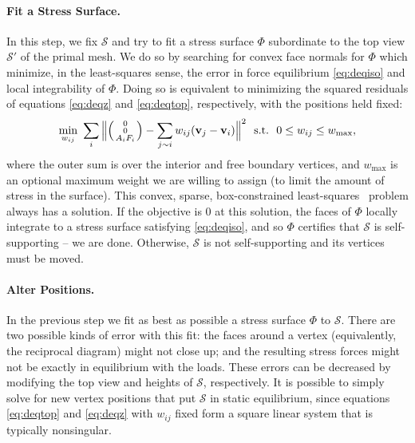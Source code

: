 \documentclass[annual]{acmsiggraph}
\makeatletter
\def\Forcevector{\Big(\mbox{\scriptsize
	\def\arraystretch{0.8}\begin{tabular}{@{\,}c@{\,}}
	0 \\ 0 \\ $A_i F_i$
	\end{tabular}}\Big)}
\def\SS{{\mathcal S}}
\makeatother
\begin{document}
\paragraph{Fit a Stress Surface.} In this step, we fix $\SS$ and try to
fit a stress surface $\Phi$ subordinate to the top view $\SS'$ of the
primal mesh. We do so by searching for convex face normals for $\Phi$
which minimize, in the least-squares sense, the error in force equilibrium
\eqref{eq:deqiso} and local integrability of $\Phi$. Doing so is
equivalent to minimizing the squared residuals of equations
\eqref{eq:deqz} and \eqref{eq:deqtop}, respectively, with the positions
held fixed:
	\begin{align}
	\min_{w_{ij}}\
	\sum_i
	\Big\| \Forcevector -
		\sum_{j\sim i} w_{ij} (\vw_j-\vw_i) \Big\|^2
	\ \
	\textrm{s.t.}\ \
		0 \leq w_{ij} \leq w_{\max}, \label{eq:wbounds}
\end{align}
 where the outer sum is over the interior and free boundary vertices, and
$w_\textrm{max}$ is an optional maximum weight we are willing to assign
(to limit the amount of stress in the surface). This convex, sparse,
box-constrained least-squares~\cite{BCLS} problem always has a solution. If the
objective is $0$ at this solution, the faces of $\Phi$ locally integrate
to a stress surface satisfying \eqref{eq:deqiso}, and so $\Phi$ certifies
that $\SS$ is self-supporting -- we are done. Otherwise, $\SS$ is not
self-supporting and its vertices must be moved.

\paragraph{Alter Positions.} In the previous step we fit as best as
possible a stress surface $\Phi$ to $\SS$. There are two possible kinds of
error with this fit: the faces around a vertex (equivalently, the
reciprocal diagram) might not close up; and the resulting stress forces
might not be exactly in equilibrium with the loads. These errors can be
decreased by modifying the top view and heights of $\SS$, respectively. It
is possible to simply solve for new vertex positions that put $\SS$ in
static equilibrium, since equations \eqref{eq:deqtop} and \eqref{eq:deqz}
with $w_{ij}$ fixed form a square linear system that is typically
nonsingular.
\end{document}
